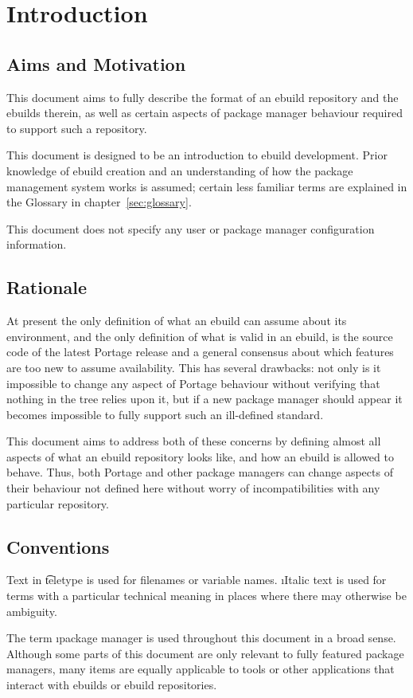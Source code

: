\chapter{Introduction}

\section{Aims and Motivation}

This document aims to fully describe the format of an ebuild repository and the ebuilds therein, as
well as certain aspects of package manager behaviour required to support such a repository.

This document is  designed to be an introduction to ebuild development. Prior knowledge of
ebuild creation and an understanding of how the package management system works is assumed; certain
less familiar terms are explained in the Glossary in chapter~\ref{sec:glossary}.

This document does not specify any user or package manager configuration information.

\section{Rationale}

At present the only definition of what an ebuild can assume about its environment,
and the only definition of what is valid in an ebuild, is the source code of the latest Portage release
and a general consensus about which features are too new to assume availability. This has several
drawbacks: not only is it impossible to change any aspect of Portage behaviour without verifying
that nothing in the tree relies upon it, but if a new package manager should appear it becomes
impossible to fully support such an ill-defined standard.

This document aims to address both of these concerns by defining almost all aspects of what an
ebuild repository looks like, and how an ebuild is allowed to behave. Thus, both Portage and other
package managers can change aspects of their behaviour not defined here without worry of
incompatibilities with any particular repository.

\section{Conventions}

Text in \t{teletype} is used for filenames or variable names. \i{Italic} text is used for terms
with a particular technical meaning in places where there may otherwise be ambiguity.

The term \i{package manager} is used throughout this document in a broad sense. Although some parts
of this document are only relevant to fully featured package managers, many items are equally
applicable to tools or other applications that interact with ebuilds or ebuild repositories.


